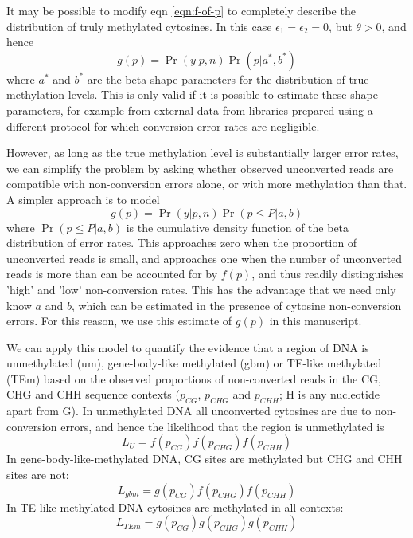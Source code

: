 \documentclass[twocolumn,twoside,lettersize]{article}
\begin{document}
It may be possible to modify eqn \ref{eqn:f-of-p} to completely describe the distribution of truly methylated cytosines.
In this case $\epsilon_1=\epsilon_2=0$, but $\theta>0$, and hence
\begin{equation}
    g(p) = \Pr(y | p, n) \Pr(p | a^*,b^*)
    \label{eqn:f-of-p}
\end{equation}
where $a^*$ and $b^*$ are the beta shape parameters for the distribution of true methylation levels.
This is only valid if it is possible to estimate these shape parameters, for example from external data from libraries prepared using a different protocol for which conversion error rates are negligible.

However, as long as the true methylation level is substantially larger error rates, we can simplify the problem by asking whether observed unconverted reads are compatible with non-conversion errors alone, or with more methylation than that.
A simpler approach is to model 
\begin{equation}
    g(p) = \Pr(y | p, n) \Pr(p \leq P | a,b)
\end{equation}
where $\Pr(p \leq P | a,b)$ is the cumulative density function of the beta distribution of error rates.
This approaches zero when the proportion of unconverted reads is small, and approaches one when the number of unconverted reads is more than can be accounted for by $f(p)$, and thus readily distinguishes 'high' and 'low' non-conversion rates.
This has the advantage that we need only know $a$ and $b$, which can be estimated in the presence of cytosine non-conversion errors.
For this reason, we use this estimate of $g(p)$ in this manuscript.

We can apply this model to quantify the evidence that a region of DNA is unmethylated (um), gene-body-like methylated (gbm) or TE-like methylated (TEm) based on the observed proportions of non-converted reads in the CG, CHG and CHH sequence contexts ($p_{CG}$, $p_{CHG}$ and $p_{CHH}$; H is any nucleotide apart from G).
In unmethylated DNA all unconverted cytosines are due to non-conversion errors, and hence the likelihood that the region is unmethylated is
\begin{equation}
    L_U = f(p_{CG}) f(p_{CHG}) f(p_{CHH})
\end{equation}
In gene-body-like-methylated DNA, CG sites are methylated but CHG and CHH sites are not: 
\begin{equation}
    L_{gbm} = g(p_{CG}) f(p_{CHG}) f(p_{CHH})
\end{equation}
In TE-like-methylated DNA cytosines are methylated in all contexts:
\begin{equation}
    L_{TEm} = g(p_{CG}) g(p_{CHG}) g(p_{CHH})
\end{equation}
\end{document}
